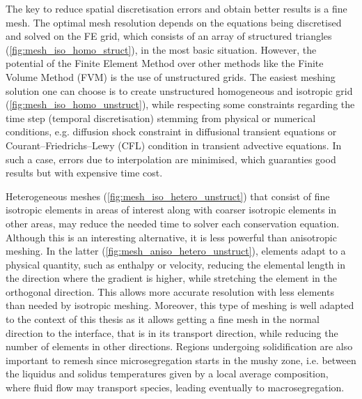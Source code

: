 The key to reduce spatial discretisation errors and obtain better results is a fine mesh. The optimal mesh resolution
depends on the equations being discretised and solved on the FE grid, which consists of an array of structured triangles (\cref{fig:mesh_iso_homo_struct}), 
in the most basic situation. However, the potential of the Finite Element Method 
over other methods like the Finite Volume Method (FVM) 
is the use of unstructured grids. The easiest meshing solution one can 
choose is to create unstructured homogeneous and isotropic grid 
(\cref{fig:mesh_iso_homo_unstruct}), while respecting some constraints regarding the time step (temporal
discretisation) stemming from physical or numerical conditions, e.g. diffusion shock constraint in diffusional transient equations
or Courant–Friedrichs–Lewy (CFL) condition in transient advective equations. 
In such a case, errors due to interpolation are minimised,
which guaranties good results but with expensive time cost. 

Heterogeneous meshes (\cref{fig:mesh_iso_hetero_unstruct}) that consist of fine isotropic elements
in areas of interest along with coarser isotropic elements in other areas, may reduce the needed time to solver each conservation
equation. Although this is an interesting alternative, it is less powerful than anisotropic meshing. 
In the latter (\cref{fig:mesh_aniso_hetero_unstruct}),
elements adapt to a physical quantity, such as enthalpy or velocity, 
reducing the elemental length in the direction where the gradient is higher, 
while stretching the element in the orthogonal direction. This allows more accurate 
resolution with less elements than needed by isotropic meshing. Moreover, this type of 
meshing is well adapted to the context of this thesis 
as it allows getting a fine mesh in the normal direction to the interface, that is
in its transport direction, while reducing the number of elements in other directions.
Regions undergoing solidification are also important to remesh since microsegregation 
starts in the mushy zone, i.e. between the liquidus and solidus temperatures given by a local average
composition, where fluid flow may transport species, leading eventually to macrosegregation.

